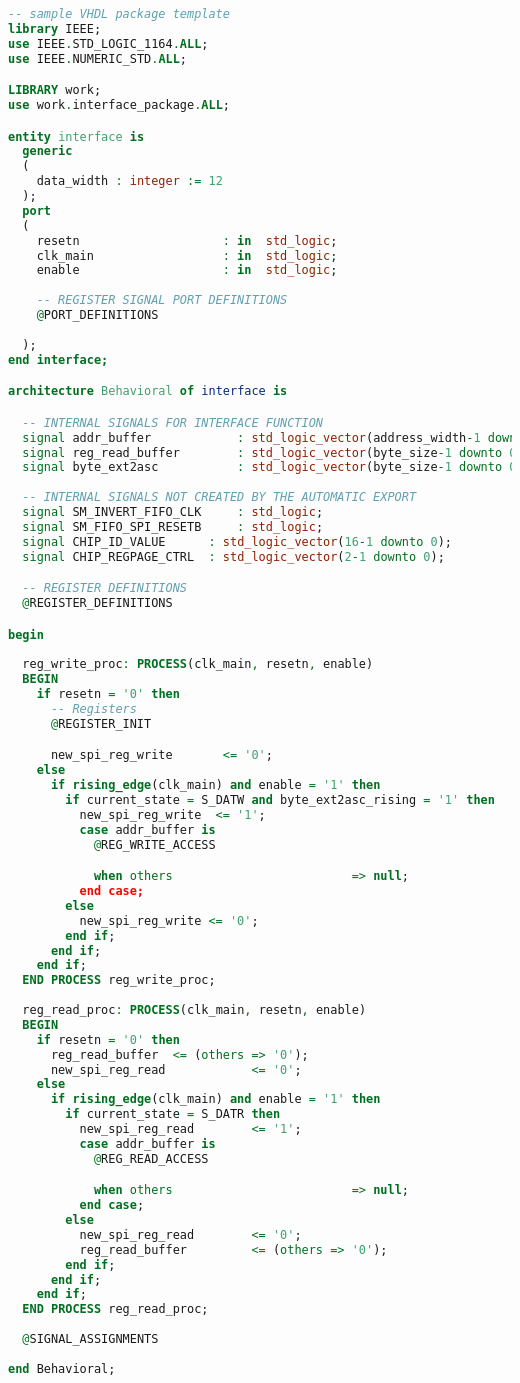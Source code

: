 \begin{lstlisting}[language=VHDL, caption={VHDL Interface Template\label{lst:VHDL Interface Template}}]
-- sample VHDL package template
library IEEE;
use IEEE.STD_LOGIC_1164.ALL;
use IEEE.NUMERIC_STD.ALL;

LIBRARY work;
use work.interface_package.ALL;

entity interface is
  generic
  (
    data_width : integer := 12
  );
  port
  (
    resetn                    : in  std_logic;
    clk_main                  : in  std_logic;
    enable                    : in  std_logic;
    
    -- REGISTER SIGNAL PORT DEFINITIONS      
    @PORT_DEFINITIONS
 
  );
end interface;

architecture Behavioral of interface is

  -- INTERNAL SIGNALS FOR INTERFACE FUNCTION
  signal addr_buffer            : std_logic_vector(address_width-1 downto 0);
  signal reg_read_buffer        : std_logic_vector(byte_size-1 downto 0);
  signal byte_ext2asc           : std_logic_vector(byte_size-1 downto 0);
  
  -- INTERNAL SIGNALS NOT CREATED BY THE AUTOMATIC EXPORT
  signal SM_INVERT_FIFO_CLK     : std_logic;  
  signal SM_FIFO_SPI_RESETB     : std_logic;
  signal CHIP_ID_VALUE		: std_logic_vector(16-1 downto 0);
  signal CHIP_REGPAGE_CTRL	: std_logic_vector(2-1 downto 0);

  -- REGISTER DEFINITIONS
  @REGISTER_DEFINITIONS

begin 
  
  reg_write_proc: PROCESS(clk_main, resetn, enable)
  BEGIN
    if resetn = '0' then
      -- Registers
      @REGISTER_INIT

      new_spi_reg_write       <= '0';
    else
      if rising_edge(clk_main) and enable = '1' then
        if current_state = S_DATW and byte_ext2asc_rising = '1' then
          new_spi_reg_write  <= '1';
          case addr_buffer is
            @REG_WRITE_ACCESS

            when others                         => null;
          end case;
        else
          new_spi_reg_write <= '0';
        end if;
      end if;
    end if;
  END PROCESS reg_write_proc;
  
  reg_read_proc: PROCESS(clk_main, resetn, enable)
  BEGIN
    if resetn = '0' then
      reg_read_buffer  <= (others => '0');
      new_spi_reg_read            <= '0';
    else
      if rising_edge(clk_main) and enable = '1' then
        if current_state = S_DATR then
          new_spi_reg_read        <= '1';
          case addr_buffer is
            @REG_READ_ACCESS

            when others                         => null;
          end case;
        else 
          new_spi_reg_read        <= '0';
          reg_read_buffer         <= (others => '0');
        end if;
      end if;
    end if;
  END PROCESS reg_read_proc;
  
  @SIGNAL_ASSIGNMENTS
  
end Behavioral;
\end{lstlisting}

